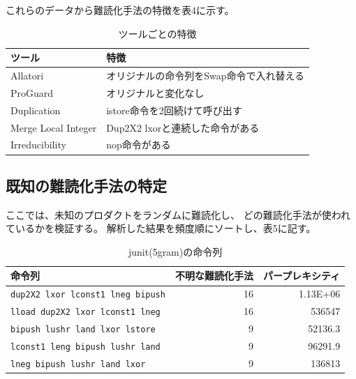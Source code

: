 \documentclass[a4j,fleqn,10pt]{jarticle}
\begin{document}
これらのデータから難読化手法の特徴を表4に示す。

\begin{table}[t]
  \centering
  \footnotesize{
    \caption{ツールごとの特徴}\label{table:caractor}
  \begin{tabular}{l|l}
    ツール              & 特徴　\\ \hline
    Allatori            & オリジナルの命令列をSwap命令で入れ替える \\
    ProGuard            & オリジナルと変化なし \\
    Duplication         & istore命令を2回続けて呼び出す \\
    Merge Local Integer & Dup2X2 lxorと連続した命令がある \\
    Irreducibility      & nop命令がある \\
  \end{tabular}}
\end{table}

\subsection{既知の難読化手法の特定}
ここでは、未知のプロダクトをランダムに難読化し、
どの難読化手法が使われているかを検証する。
解析した結果を頻度順にソートし、表5に記す。
\begin{table}[t]
  \centering
  \footnotesize{
    \caption{junit(5gram)の命令列}\label{table:junit}
  \begin{tabular}{lrr}
    命令列 & 
    \multicolumn{1}{p{1cm}}{不明な難読化手法} & 
    \multicolumn{1}{p{1cm}}{パープレキシティ} \\ \hline
    \texttt{dup2X2 lxor lconst1 lneg bipush}     & 16 & 1.13E+06 \\
    \texttt{lload dup2X2 lxor lconst1 lneg}      & 16 & 536547 \\
    \texttt{bipush lushr land lxor lstore}       &  9 & 52136.3 \\
    \texttt{lconst1 leng bipush lushr land}      &  9 & 96291.9 \\
    \texttt{lneg bipush lushr land lxor}         &  9 & 136813 \\
  \end{tabular}}
\end{table}
\end{document}
